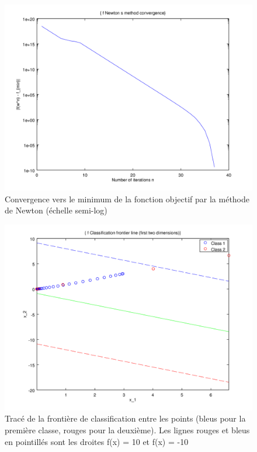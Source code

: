 \documentclass{article}
\begin{document}
         \begin{figure}
           \begin{center}
             \subfigure\includegraphics[scale=0.5]{images/cvnewton5.png}
             \caption{Convergence vers le minimum de la fonction objectif par la méthode de Newton (échelle semi-log)}
           \end{center}
         \end{figure}

         \begin{figure}
           \begin{center}
             \subfigure\includegraphics[scale=0.5]{images/line5.png}
             \caption{Tracé de la frontière de classification entre les points (bleus pour la première classe, rouges pour la deuxième). Les lignes rouges et bleus en pointillés sont les droites f(x) = 10 et f(x) = -10}
           \end{center}
         \end{figure}
\end{document}

